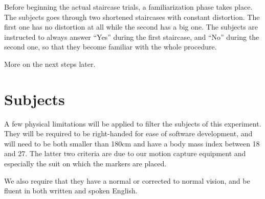 Before beginning the actual staircase trials, a familiarization phase takes place. The subjects goes through two shortened staircases with constant distortion. The first one has no distortion at all while the second has a big one. The subjects are instructed to always answer ``Yes'' during the first staircase, and ``No'' during the second one, so that they become familiar with the whole procedure.

More on the next steps later.

\section{Subjects}

A few physical limitations will be applied to filter the subjects of this experiment. They will be required to be right-handed for ease of software development, and will need to be both smaller than 180cm and have a body mass index between 18 and 27. The latter two criteria are due to our motion capture equipment and especially the suit on which the markers are placed.

We also require that they have a normal or corrected to normal vision, and be fluent in both written and spoken English.
